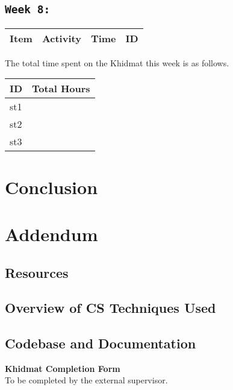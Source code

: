 \documentclass{article}
\begin{document}
\subsection{\texttt{Week 8: }}
\begin{center}
\begin{tabular}{|l|l|l|l|}
  \hline
  \textbf{Item} 	& \textbf{Activity} & \textbf{Time} & \textbf{ID} \\\hline
  
\end{tabular}
    
\end{center}
The total time spent on the Khidmat this week is as follows.    
\begin{center}
    
\begin{tabular}{|l|l|}
  \hline
  \textbf{ID} & \textbf{Total Hours}\\\hline
  st1 & \\\hline
  st2 & \\\hline
  st3 & \\\hline
\end{tabular}
\end{center}
\newpage
\section{Conclusion}
\newpage
\section{Addendum}
\subsection{Resources}
\subsection{Overview of CS Techniques Used}
\subsection{Codebase and Documentation}
\newpage
\thispagestyle{empty}

\begin{center}
  {\Large\bf Khidmat Completion Form}\\[5pt]
  \small To be completed by the external supervisor.  
\end{center}
\bigskip
\end{document}
